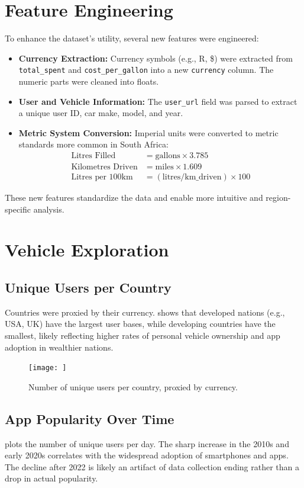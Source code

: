 \documentclass{article}
\begin{document}
\section{Feature Engineering}
To enhance the dataset's utility, several new features were engineered:
\begin{itemize}
    \item \textbf{Currency Extraction:} Currency symbols (e.g., R, \$) were extracted from \texttt{total\_spent} and \texttt{cost\_per\_gallon} into a new \texttt{currency} column. The numeric parts were cleaned into floats.
    \item \textbf{User and Vehicle Information:} The \texttt{user\_url} field was parsed to extract a unique user ID, car make, model, and year.
    \item \textbf{Metric System Conversion:} Imperial units were converted to metric standards more common in South Africa:
    \begin{align*}
        \text{Litres Filled} &= \text{gallons} \times 3.785 \\
        \text{Kilometres Driven} &= \text{miles} \times 1.609 \\
        \text{Litres per 100km} &= (\text{litres} / \text{km\_driven}) \times 100
    \end{align*}
\end{itemize}
These new features standardize the data and enable more intuitive and region-specific analysis.

\section{Vehicle Exploration}

\subsection{Unique Users per Country}
Countries were proxied by their currency.  shows that developed nations (e.g., USA, UK) have the largest user bases, while developing countries have the smallest, likely reflecting higher rates of personal vehicle ownership and app adoption in wealthier nations.

\begin{figure}[htbp]
    \centering
    \texttt{[image: ]}
    \caption{Number of unique users per country, proxied by currency.}
    \label{fig:users_per_country}
\end{figure}

\subsection{App Popularity Over Time}
 plots the number of unique users per day. The sharp increase in the 2010s and early 2020s correlates with the widespread adoption of smartphones and apps. The decline after 2022 is likely an artifact of data collection ending rather than a drop in actual popularity.
\end{document}

